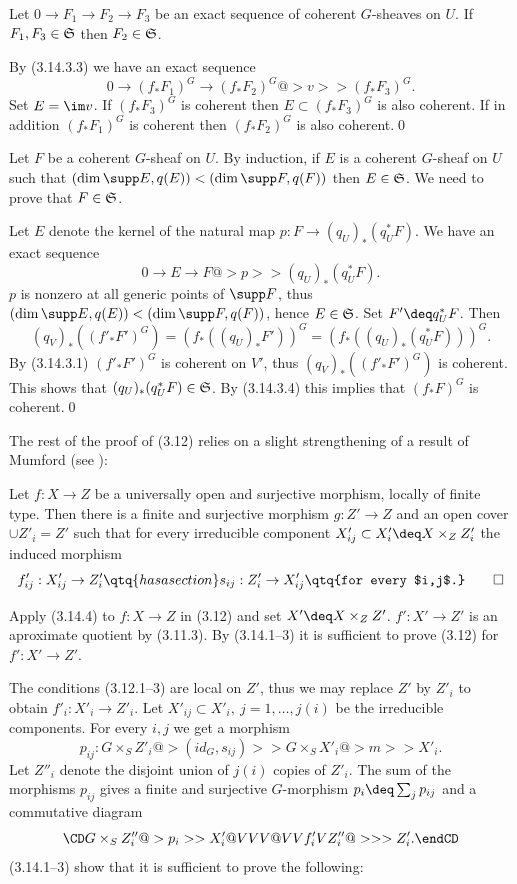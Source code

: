  Let $0\to F_1\to F_2\to F_3$ be an exact
sequence of coherent $G$-sheaves on $U$. If  $F_1,F_3\in \frak S$  then
$F_2\in \frak S$.
\endproclaim

\demop
By (3.14.3.3)  we have an exact sequence
$$
0\to (f_*F_1)^G\to (f_*F_2)^G@>v>> (f_*F_3)^G.
$$
Set  $E=\im v$. If $(f_*F_3)^G$ is coherent then $E\subset (f_*F_3)^G$
is also coherent. If in addition $(f_*F_1)^G$ is coherent then
$(f_*F_2)^G$ is also coherent.\qed
\enddemo




Let $F$ be a coherent $G$-sheaf on $U$. By induction,
if $E$ is a coherent $G$-sheaf on $U$ such that
$(\dim\supp E,q(E))<(\dim\supp F,q(F))$ then $E\in \frak S$.
We need to  prove that $F\in \frak S$.

Let $E$ denote the kernel of the natural map  $p:F\to (q_U)_*(q_U^*F)$.   We
have an exact sequence
$$
0\to E\to F@>p>> (q_U)_*(q_U^*F).
$$
$p$  is
nonzero at all generic points of
$\supp F$, thus $(\dim\supp E,q(E))<(\dim\supp F,q(F))$, hence $E\in \frak S$.
Set $F'\deq q_U^*F$. Then
$$
(q_V)_*\left((f'_*F')^G\right)=\left(f_*((q_U)_*F')\right)^G=
\left(f_*((q_U)_*(q_U^*F))\right)^G.
$$
By (3.14.3.1) $(f'_*F')^G$ is coherent on $V'$, thus
$(q_V)_*\left((f'_*F')^G\right)$ is coherent. This shows that
$(q_U)_*(q_U^*F)\in \frak S$.
By (3.14.3.4)  this implies that $(f_*F)^G$ is coherent.\qed\enddemo



The rest of the proof of (3.12)  relies on a slight strengthening of a result
of Mumford (see
\cite{EGA IV.14.5.10}):

  Let $f:X\to Z$ be a universally open and
surjective morphism, locally of finite type. Then there is a finite and
surjective morphism $g:Z'\to Z$ and an open cover $\cup Z'_i=Z'$ such that
for every irreducible component $X'_{ij}\subset X'_i\deq X\times_ZZ'_i$
the induced morphism
$$
f'_{ij}:X'_{ij}\to Z'_i\qtq{has  a section} s_{ij}:  Z'_i\to X'_{ij} \qtq{for
every
$i,j$.}\qed
$$
\endproclaim

Apply (3.14.4) to $f:X\to Z$ in (3.12) and set $X'\deq X\times_ZZ'$.
$f':X'\to Z'$ is an aproximate quotient by (3.11.3). By (3.14.1--3) it is
sufficient to prove (3.12) for $f':X'\to Z'$.

The conditions (3.12.1--3) are local on $Z'$, thus we may replace $Z'$ by
$Z'_i$ to obtain $f'_i:X'_i\to Z'_i$. Let
$X'_{ij}\subset X'_i,\ j=1,\dots, j(i)$
be the irreducible components.  For every $i,j$ we get a morphism
$$
p_{ij}: G\times_SZ'_i@>{(id_G,s_{ij})}>> G\times_S X'_i @>m>> X'_i.
$$
Let $Z''_i$ denote the disjoint union of $j(i)$ copies of $Z'_i$. The sum
of the  morphisms $p_{ij}$  gives a finite and surjective $G$-morphism
$p_i\deq \sum_jp_{ij}$
and a commutative diagram
$$
\CD
G\times_SZ''_i@>{p_i}>> X'_i\\
@VVV @VVf'_iV\\
Z''_i@>>> Z'_i.
\endCD
$$
(3.14.1--3) show that it is sufficient to prove the following:

